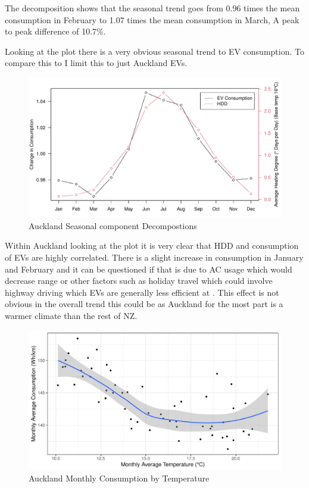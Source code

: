 \documentclass[
]{article}
\begin{document}
The decomposition shows that the seasonal trend goes from 0.96 times the
mean consumption in February to 1.07 times the mean consumption in
March, A peak to peak difference of 10.7\%.

Looking at the plot there is a very obvious seasonal trend to EV
consumption. To compare this to I limit this to just Auckland EVs.

\begin{figure}
\centering
\includegraphics{summary_week4_files/figure-latex/eff_HDD_plot-1.pdf}
\caption{Auckland Seasonal component Decompostions}
\end{figure}

Within Auckland looking at the plot it is very clear that HDD and
consumption of EVs are highly correlated. There is a slight increase in
consumption in January and February and it can be questioned if that is
due to AC usage which would decrease range \cite{ev_range} or other
factors such as holiday travel which could involve highway driving which
EVs are generally less efficient at \cite{ev_highway}. This effect is
not obvious in the overall trend this could be as Auckland for the most
part is a warmer climate than the rest of NZ.

\begin{figure}
\centering
\includegraphics{summary_week4_files/figure-latex/temp_eff_plot-1.pdf}
\caption{Auckland Monthly Consumption by Temperature}
\end{figure}
\end{document}
